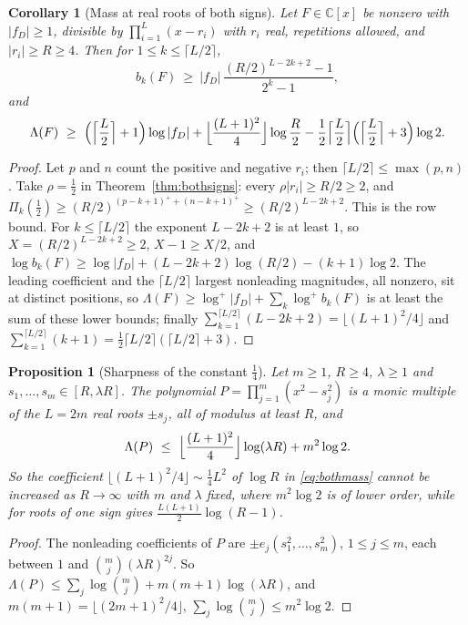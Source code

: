 \documentclass[11pt]{article}
\newtheorem{corollary}[theorem]{Corollary}
\newtheorem{proposition}[theorem]{Proposition}
\begin{document}
\begin{corollary}[Mass at real roots of both signs]\label{cor:bothsignsmass}
Let $F\in\mathbb C[x]$ be nonzero with $|f_D|\ge1$, divisible by
$\prod_{i=1}^L(x-r_i)$ with $r_i$ real, repetitions allowed, and $|r_i|\ge R\ge4$.
Then for $1\le k\le\lceil L/2\rceil$,
\[
  b_k(F)\ \ge\ |f_D|\,\frac{(R/2)^{L-2k+2}-1}{2^k-1},
\]
and
\begin{equation}\label{eq:bothmass}
  \Lambda(F)\ \ge\ \Bigl(\Bigl\lceil\frac L2\Bigr\rceil+1\Bigr)\log|f_D|
  +\Bigl\lfloor\frac{(L+1)^2}4\Bigr\rfloor\log\frac R2
  -\frac12\Bigl\lceil\frac L2\Bigr\rceil\Bigl(\Bigl\lceil\frac L2\Bigr\rceil+3\Bigr)\log2 .
\end{equation}
\end{corollary}

\begin{proof}
Let $p$ and $n$ count the positive and negative $r_i$; then
$\lceil L/2\rceil\le\max(p,n)$.  Take $\rho=\frac12$ in
Theorem~\ref{thm:bothsigns}: every $\rho|r_i|\ge R/2\ge2$, and
$\Pi_k(\tfrac12)\ge(R/2)^{(p-k+1)^++(n-k+1)^+}\ge(R/2)^{L-2k+2}$.  This is the row
bound.  For $k\le\lceil L/2\rceil$ the exponent $L-2k+2$ is at least $1$, so
$X=(R/2)^{L-2k+2}\ge2$, $X-1\ge X/2$, and
$\log b_k(F)\ge\log|f_D|+(L-2k+2)\log(R/2)-(k+1)\log2$.  The leading coefficient
and the $\lceil L/2\rceil$ largest nonleading magnitudes, all nonzero, sit at
distinct positions, so $\Lambda(F)\ge\log^+|f_D|+\sum_k\log^+b_k(F)$ is at
least the sum of these lower bounds; finally
$\sum_{k=1}^{\lceil L/2\rceil}(L-2k+2)=\lfloor(L+1)^2/4\rfloor$ and
$\sum_{k=1}^{\lceil L/2\rceil}(k+1)=\frac12\lceil L/2\rceil(\lceil L/2\rceil+3)$.
\end{proof}

\begin{proposition}[Sharpness of the constant $\frac14$]\label{prop:bothsignssharp}
Let $m\ge1$, $R\ge4$, $\lambda\ge1$ and $s_1,\ldots,s_m\in[R,\lambda R]$.  The
polynomial $P=\prod_{j=1}^m(x^2-s_j^2)$ is a monic multiple of the $L=2m$ real
roots $\pm s_j$, all of modulus at least $R$, and
\[
  \Lambda(P)\ \le\ \Bigl\lfloor\frac{(L+1)^2}4\Bigr\rfloor\log(\lambda R)+m^2\log2 .
\]
So the coefficient $\lfloor(L+1)^2/4\rfloor\sim\frac14L^2$ of $\log R$ in
\eqref{eq:bothmass} cannot be increased as $R\to\infty$ with $m$ and
$\lambda$ fixed, where $m^2\log2$ is of lower order, while for roots of one sign
\cite[Corollary~3.4]{coefficient-mass} gives $\frac{L(L+1)}2\log(R-1)$.
\end{proposition}

\begin{proof}
The nonleading coefficients of $P$ are $\pm e_j(s_1^2,\ldots,s_m^2)$,
$1\le j\le m$, each between $1$ and $\binom mj(\lambda R)^{2j}$.  So
$\Lambda(P)\le\sum_j\log\binom mj+m(m+1)\log(\lambda R)$, and
$m(m+1)=\lfloor(2m+1)^2/4\rfloor$, $\sum_j\log\binom mj\le m^2\log2$.
\end{proof}
\end{document}

